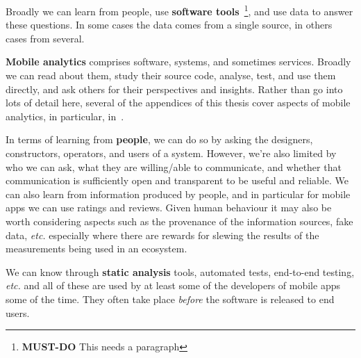 


Broadly we can learn from people, use \textbf{software tools}~\footnote{\textbf{MUST-DO} This needs a paragraph}, and use data to answer these questions. In some cases the data comes from a single source, in others cases from several.



\textbf{Mobile analytics} comprises software, systems, and sometimes services. Broadly we can read about them, study their source code, analyse, test, and use them directly, and ask others for their perspectives and insights. Rather than go into lots of detail here, several of the appendices of this thesis cover aspects of mobile analytics, in particular, in~\href{app:on-mobile-analytics}{\emph{}}. 

In terms of learning from \textbf{people}, we can do so by asking the designers, constructors, operators, and users of a system. However, we're also limited by who we can ask, what they are willing/able to communicate, and whether that communication is sufficiently open and transparent to be useful and reliable. We can also learn from information produced by people, and in particular for mobile apps we can use ratings and reviews. Given human behaviour it may also be worth considering aspects such as the provenance of the information sources, fake data, \emph{etc.} especially where there are rewards for slewing the results of the measurements being used in an ecosystem. 

We can know through \textbf{static analysis} tools, automated tests, end-to-end testing, \emph{etc.} and all of these are used by at least some of the developers of mobile apps some of the time. They often take place \textit{before} the software is released to end users.

